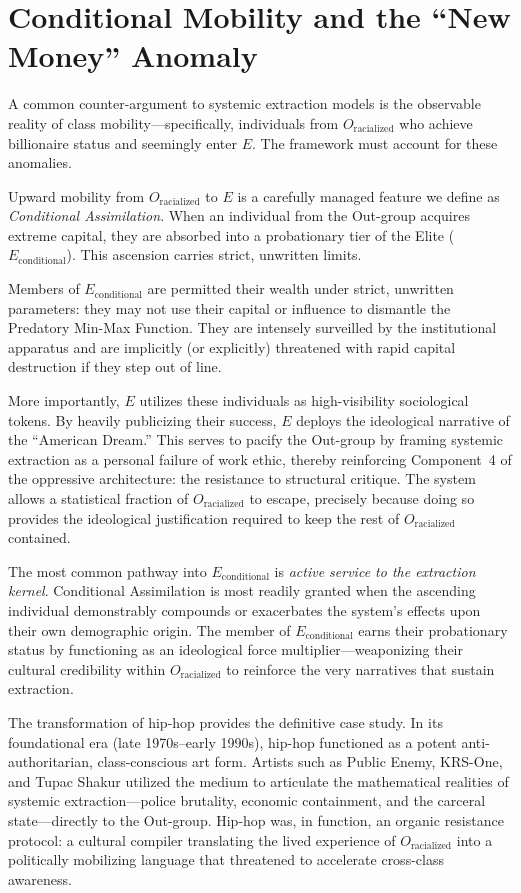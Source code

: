 \section{Conditional Mobility and the ``New Money'' Anomaly}

A common counter-argument to systemic extraction models is the observable reality of class mobility---specifically, individuals from $O_{\text{racialized}}$ who achieve billionaire status and seemingly enter $E$. The framework must account for these anomalies.

Upward mobility from $O_{\text{racialized}}$ to $E$ is a carefully managed feature we define as \textit{Conditional Assimilation}. When an individual from the Out-group acquires extreme capital, they are absorbed into a probationary tier of the Elite ($E_{\text{conditional}}$). This ascension carries strict, unwritten limits.

Members of $E_{\text{conditional}}$ are permitted their wealth under strict, unwritten parameters: they may not use their capital or influence to dismantle the Predatory Min-Max Function. They are intensely surveilled by the institutional apparatus and are implicitly (or explicitly) threatened with rapid capital destruction if they step out of line.

More importantly, $E$ utilizes these individuals as high-visibility sociological tokens. By heavily publicizing their success, $E$ deploys the ideological narrative of the ``American Dream.'' This serves to pacify the Out-group by framing systemic extraction as a personal failure of work ethic, thereby reinforcing Component~4 of the oppressive architecture: the resistance to structural critique. The system allows a statistical fraction of $O_{\text{racialized}}$ to escape, precisely because doing so provides the ideological justification required to keep the rest of $O_{\text{racialized}}$ contained.

The most common pathway into $E_{\text{conditional}}$ is \textit{active service to the extraction kernel}. Conditional Assimilation is most readily granted when the ascending individual demonstrably compounds or exacerbates the system's effects upon their own demographic origin. The member of $E_{\text{conditional}}$ earns their probationary status by functioning as an ideological force multiplier---weaponizing their cultural credibility within $O_{\text{racialized}}$ to reinforce the very narratives that sustain extraction.

The transformation of hip-hop provides the definitive case study. In its foundational era (late 1970s--early 1990s), hip-hop functioned as a potent anti-authoritarian, class-conscious art form. Artists such as Public Enemy, KRS-One, and Tupac Shakur utilized the medium to articulate the mathematical realities of systemic extraction---police brutality, economic containment, and the carceral state---directly to the Out-group. Hip-hop was, in function, an organic resistance protocol: a cultural compiler translating the lived experience of $O_{\text{racialized}}$ into a politically mobilizing language that threatened to accelerate cross-class awareness.

